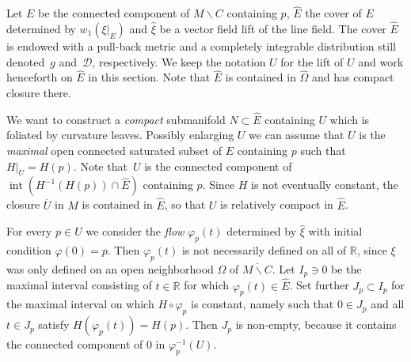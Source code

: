 \documentclass[JEP,XML,SOM,Unicode]{cedram}
\let\mathcal\mathscr
\let\moins\smallsetminus
\DeclareMathOperator{\inte}{int}
\theoremstyle{definition}
\theoremstyle{remark}
\numberwithin{equation}{section}
\newcommand{\RR}{\mathbb R}
\begin{document}
Let $E$ be the connected component of $M\moins C$ containing $p$,
$\widehat{E}$ the cover of $E$ determined by $w_1(\xi|_E)$
and $\widehat{\xi}$ be a vector field lift of the line field.
The cover $\widehat{E}$ is endowed with a pull-back metric and a
completely integrable distribution still denoted~$g$ and~$\mathcal D$, respectively. We keep the notation $U$ for the lift of $U$ and work henceforth on $\widehat{E}$ in this section.
Note that $\widehat{E}$ is contained in $\widehat{\Omega}$ and has compact closure there.

We want to construct a \emph{compact} submanifold $N\subset \widehat{E}$
containing $U$ which is foliated by curvature leaves.
Possibly enlarging $U$ we can assume that $U$ is the
\emph{maximal} open connected saturated subset of $E$ containing $p$
such that $H|_{U}=H(p)$. Note that~$U$ is the connected component
of $\inte (H^{-1}(H(p))\cap \widehat{E})$ containing $p$. Since $H$ is not eventually constant, the closure
$\overline{U}$ in $M$ is contained in $\widehat{E}$, so that $U$ is relatively compact in $\widehat{E}$.

For every $p\in U$ we consider the \emph{flow} $\varphi_p(t)$ determined by $\widehat{\xi}$ with initial condition
$\varphi(0)=p$. Then $\varphi_p(t)$ is not necessarily defined on all of $\RR$, since
$\xi$ was only defined on an open neighborhood $\Omega$ of $\overline{M\moins C}$.
Let $I_p\ni 0$ be the maximal interval consisting of $t\in \RR$ for which $\varphi_p(t)\in \widehat{E}$.
Set further $J_p\subset I_p$ for the maximal interval on which $H\circ \varphi_p$ is constant, namely such that $0\in J_p$ and
all $t\in J_p$ satisfy $H(\varphi_p(t))=H(p)$. Then $J_p$ is non-empty, because it contains
the connected component of $0$ in $\varphi_p^{-1}(U)$.
\end{document}
